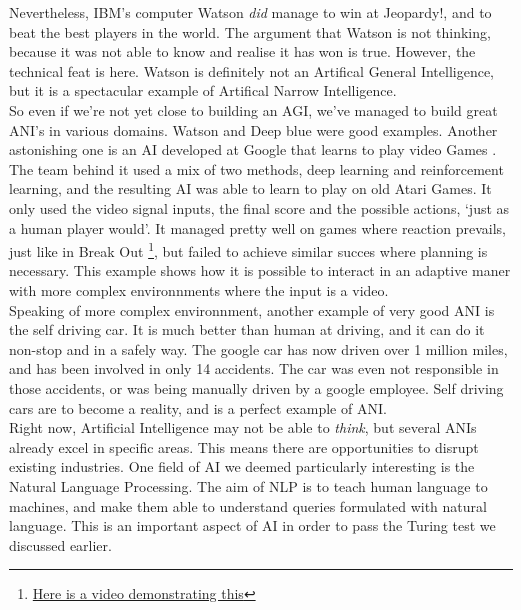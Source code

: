 \documentclass[12pt]{article}
\begin{document}
Nevertheless, IBM's computer Watson {\em did} manage to win at Jeopardy!, and to
beat the best players in the world. The argument that Watson is not thinking,
because it was not able to know and realise it has won is true. However, the
technical feat is here. Watson is definitely not an Artifical General
Intelligence, but it is a spectacular example of Artifical Narrow Intelligence.
\\

So even if we're not yet close to building an AGI, we've managed to build great
ANI's in various domains. Watson and Deep blue were good examples. Another
astonishing one is an AI developed at Google that learns to play video Games
\cite{Atari}. The team behind it used a mix of two methods, deep learning and
reinforcement learning, and the resulting AI
was able to learn to play on old Atari Games. It only used the video signal
inputs, the final score and the possible actions, \lq just as a human player
would\rq. It managed pretty well on games where reaction prevails, just like in
Break Out \footnote{\href{https://www.youtube.com/watch?v=cjpEIotvwFY}
{Here is a video demonstrating this}}, but failed to achieve similar succes
where planning is necessary. This example shows how it is possible to interact
in an adaptive maner with more complex environnments where the input is a video.
\\

Speaking of more complex environnment, another example of very good ANI is the
self driving car. It is much better than human at driving, and it can do it
non-stop and in a safely way. The google car has now driven over 1 million miles,
and has been involved in only 14 accidents. The car was even not responsible in
those accidents, or was being manually driven by a google employee. Self driving
cars are to become a reality, and is a perfect example of ANI.
\\

Right now, Artificial Intelligence may not be able to {\em think}, but several
ANIs already excel in specific areas. This means there are opportunities to
disrupt existing industries. One field of AI we deemed particularly interesting
is the Natural Language Processing. The aim of NLP is to teach human language to
machines, and make them able to understand queries formulated with natural
language. This is an important aspect of AI in order to pass the Turing test we
discussed earlier.
\\
\end{document}
